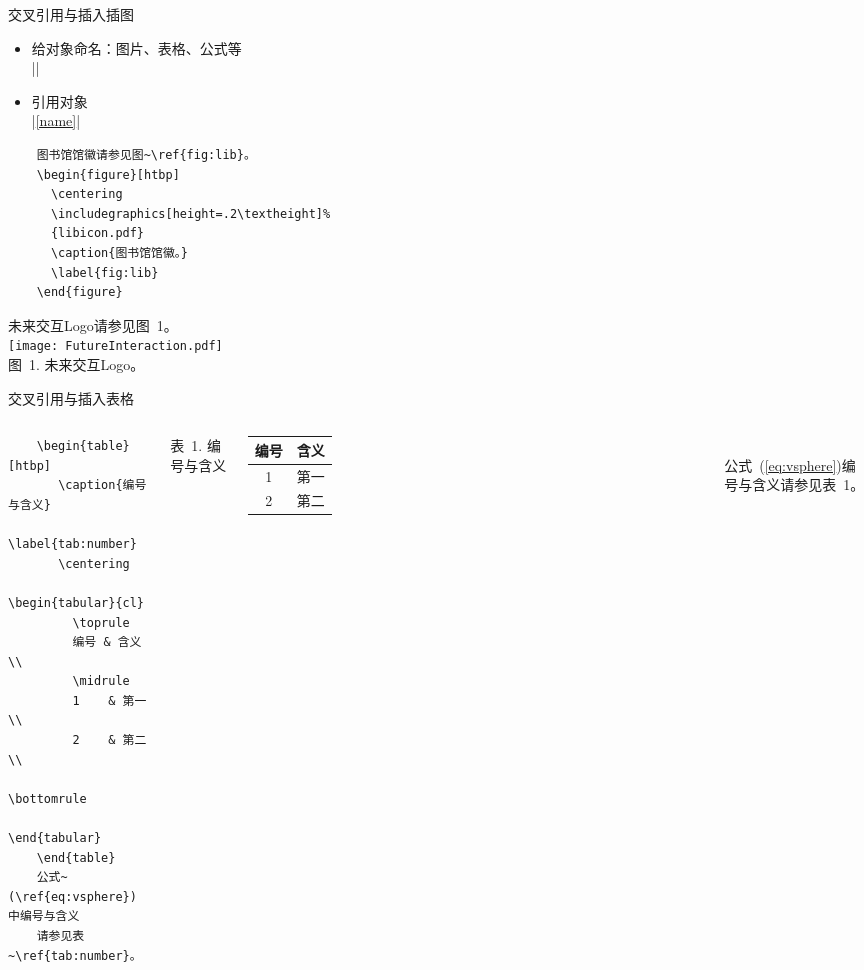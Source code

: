     
    \begin{frame}[fragile]{交叉引用与插入插图}
      \begin{itemize}
      \item 给对象命名：图片、表格、公式等\\
      |\label{name}|
    \item 引用对象\\
      |\ref{name}|
      \end{itemize}
    \bigskip
    
      \begin{minipage}{0.7\linewidth}
        \begin{lstlisting}
    图书馆馆徽请参见图~\ref{fig:lib}。
    \begin{figure}[htbp]
      \centering
      \includegraphics[height=.2\textheight]%
      {libicon.pdf}
      \caption{图书馆馆徽。}
      \label{fig:lib}
    \end{figure}
    \end{lstlisting}
      \end{minipage}\hfill
      \begin{minipage}{0.3\linewidth}\centering
        {\songti 未来交互Logo请参见图~1。}\\[1em]
     \texttt{[image: FutureInteraction.pdf]}\\
     {\footnotesize\heiti 图~1. 未来交互Logo。}
      \end{minipage}
    \end{frame}
    
    \begin{frame}[fragile]{交叉引用与插入表格}
      \begin{columns}
      \begin{lstlisting}
    \begin{table}[htbp]
       \caption{编号与含义}
       \label{tab:number}
       \centering
       \begin{tabular}{cl}
         \toprule
         编号 & 含义 \\
         \midrule
         1    & 第一 \\
         2    & 第二 \\
         \bottomrule
       \end{tabular}
    \end{table}
    公式~(\ref{eq:vsphere}) 中编号与含义
    请参见表~\ref{tab:number}。
    \end{lstlisting}
    \centering
    {\small 表~1. 编号与含义}\\[2pt]
    \begin{tabular}{cl}\toprule
    编号 & 含义 \\\midrule
    1 & 第一\\
    2  & 第二\\\bottomrule
    \end{tabular}\\[5pt]
    
    \normalsize 公式~(\ref{eq:vsphere})编号与含义请参见表~1。
      \end{columns}
    \end{frame}
    
